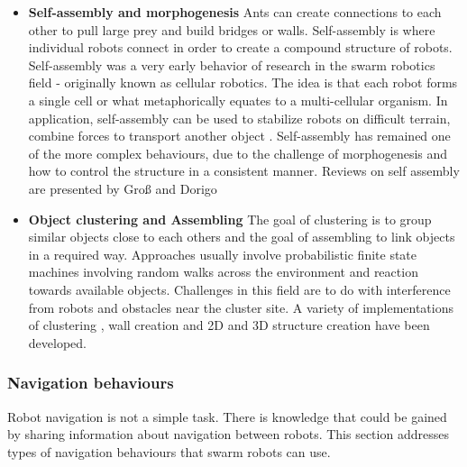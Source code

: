 \begin{itemize}
	\item \textbf{Self-assembly and morphogenesis}
	Ants can create connections to each other to pull large prey and build bridges or walls. Self-assembly is where individual robots connect in order to create a compound structure of robots. Self-assembly was a very early behavior of research in the swarm robotics field - originally known as cellular robotics. The idea is that each robot forms a single cell or what metaphorically equates to a multi-cellular organism. In application, self-assembly can be used to stabilize robots on difficult terrain, combine forces to transport another object \cite{brambilla2013swarm}. Self-assembly has remained one of the more complex behaviours, due to the challenge of morphogenesis and how to control the structure in a consistent manner.  
Reviews on self assembly are presented by Groß and Dorigo \cite{gross2008self}	
	
	\item \textbf{Object clustering and Assembling}
	The goal of clustering is to group similar objects close to each others and the goal of assembling to link objects in a required way. Approaches usually involve probabilistic finite state machines involving random walks across the environment and reaction towards available objects. Challenges in this field are to do with interference from robots and obstacles near the cluster site. A variety of implementations of clustering \cite{beckers1994local}, wall creation \cite{wawerla2002collective} and 2D and 3D structure creation \cite{werfel2006extended, werfel2011distributed} have been developed. 
\end{itemize}

\subsubsection{Navigation behaviours}
Robot navigation is not a simple task. There is knowledge that could be gained by sharing information about navigation between robots. This section addresses types of navigation behaviours that swarm robots can use. 

